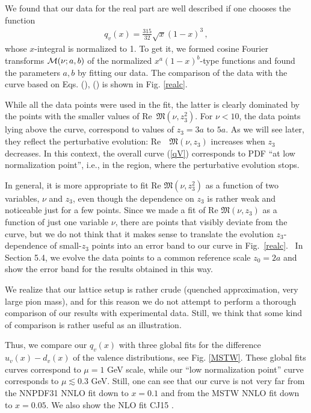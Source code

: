 We found that our  data for the real part are well described  if one
chooses       the function
     \begin{align}
    q_v(x) =  \frac{315}{32} \sqrt{x}  (1-x)^{3}\,  ,
    \label{qV}
    \end{align}
whose $x$-integral is normalized to 1.
To get it, we formed cosine Fourier transforms ${\cal M} (\nu;a,b)$ of the
normalized $x^a(1-x)^b$-type  functions
and found the parameters $a,b$  by  fitting    our data.
The comparison of the  data with the  curve based on
Eqs. (\relax {\ref{MC}}), (\relax {\ref{qV}})  is shown in Fig.  \ref{realc}.

While all the data points were used in the fit, the latter  is clearly dominated by  %
the points with the smaller values of   Re\ ${\mathfrak  M} (\nu, z_3^2)$.   %
For $\nu <10$,  the data points  lying  above the curve, correspond to  %
values of $z_3=3a$ to $5a$. As we will see later, they  reflect the perturbative evolution:  %
\mbox{Re \ ${\mathfrak  M} (\nu, z_3)$}  increases when $z_3$ decreases.  %
In this context, the overall  curve (\ref{qV}) corresponds to PDF  ``at low normalization point'', %
i.e.,  in  the region, where the perturbative evolution stops. %

In general,  it is more  appropriate to fit  Re  ${\mathfrak  M} (\nu, z_3^2)$ as a function of two variables,  %
$\nu$ and $ z_3$, even though the dependence on $z_3$  is rather weak and  %
noticeable  just for a few points. Since  we made a fit of  Re  ${\mathfrak  M} (\nu, z_3)$ %
as a function of just one variable $\nu$, there are points that visibly deviate
from the curve, but we do not think that  %
 it  makes    sense to translate the evolution $z_3$-dependence %
of small-$z_3$  points into    %
an error band to our curve in \mbox{Fig.  \ref{realc}. }  %
In Section 5.4, we evolve the data points to a common reference scale $z_0=2a %
$ and show the error band for the results obtained in this way.  %

We realize   that our lattice setup  is rather crude (quenched approximation, very large pion mass), %
and for this reason  we do not attempt  to perform a thorough comparison of our results %
with experimental data. Still,  we think that some  kind of comparison is rather useful as  an illustration.  %

Thus, we %
compare our $q_v (x) $ with three  global fits
for the difference \mbox{$u_v(x) -d_v(x)$}  of the valence distributions,  see Fig. \ref{MSTW}.
These global  fits curves correspond to   $\mu=1$ GeV scale, while our  %
``low normalization point'' curve corresponds to $\mu \lesssim 0.3$ GeV.  %
Still, one can see that our curve is not very far from the %
NNPDF31  \cite{Ball:2017nwa}  NNLO fit down  to $x=0.1$
 and from the   MSTW  \cite{Martin:2009iq} NNLO  fit  down  to $x=0.05$.
 We also show the NLO fit CJ15  \cite{Accardi:2016qay}.




